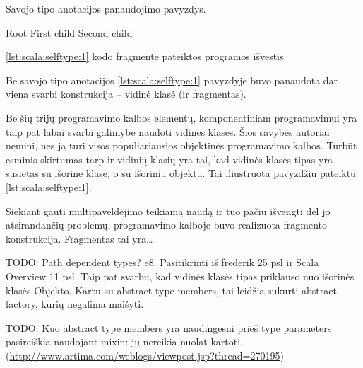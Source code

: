 \begin{listing}[H]
  \caption{Savojo tipo anotacijos panaudojimo pavyzdys.}
  \label{lst:scala:selftype:1}
\end{listing}

\begin{listing}[H]
  \begin{textcode}
    Root
    First child
    Second child
  \end{textcode}
  \caption{\ref{lst:scala:selftype:1} kodo fragmente pateiktos programos
  išvestis.}
  \label{lst:scala:selftype:2}
\end{listing}

Be savojo tipo anotacijos \ref{lst:scala:selftype:1} pavyzdyje buvo
panaudota dar viena svarbi konstrukcija – vidinė klasė (ir fragmentas).

Be šių trijų programavimo kalbos elementų, komponentiniam programavimui
yra taip pat labai svarbi galimybė naudoti vidines klases. Šios
savybės  autoriai nemini, nes ją turi visos
populiariausios objektinės programavimo kalbos. Turbūt esminis
skirtumas tarp  ir  vidinių klasių
yra tai, kad  vidinės klasės tipas yra susietas su
išorine klase, o  su išoriniu objektu. Tai
iliustruota pavyzdžiu pateiktu \ref{lst:scala:selftype:1}.

Siekiant gauti multipaveldėjimo teikiamą naudą ir tuo pačiu išvengti
dėl jo atsirandančių problemų,  programavimo
kalboje buvo realizuota fragmento  konstrukcija.
Fragmentas tai yra…

TODO: Path dependent types? e8. Pasitikrinti iš frederik 25 psl ir
Scala Overview 11 psl. Taip pat svarbu, kad vidinės klasės tipas
priklauso nuo išorinės klasės Objekto. Kartu su abstract type
members, tai leidžia sukurti abstract factory, kurių negalima
maišyti.

TODO: Kuo abstract type members yra naudingesni prieš type parameters
pasireiškia naudojant mixin: jų nereikia nuolat kartoti.
(\url{http://www.artima.com/weblogs/viewpost.jsp?thread=270195})

